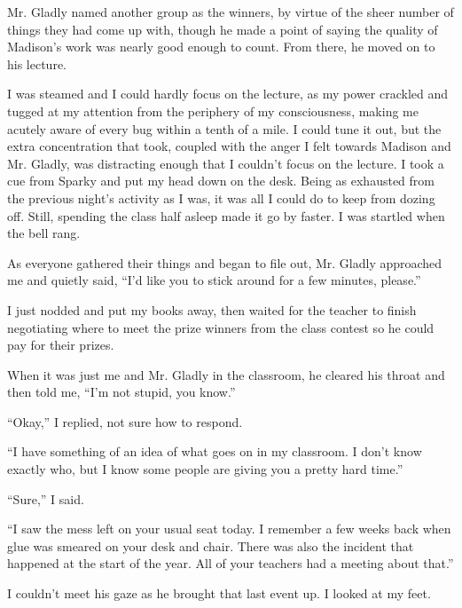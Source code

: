 Mr. Gladly named another group as the winners, by virtue of the sheer number of things they had come up with, though he made a point of saying the quality of Madison's work was nearly good enough to count.  From there, he moved on to his lecture.



I was steamed and I could hardly focus on the lecture, as my power crackled and tugged at my attention from the periphery of my consciousness, making me acutely aware of every bug within a tenth of a mile.  I could tune it out, but the extra concentration that took, coupled with the anger I felt towards Madison and Mr. Gladly, was distracting enough that I couldn't focus on the lecture.  I took a cue from Sparky and put my head down on the desk.  Being as exhausted from the previous night's activity as I was, it was all I could do to keep from dozing off.  Still, spending the class half asleep made it go by faster.  I was startled when the bell rang.



As everyone gathered their things and began to file out, Mr. Gladly approached me and quietly said, ``I'd like you to stick around for a few minutes, please.''



I just nodded and put my books away, then waited for the teacher to finish negotiating where to meet the prize winners from the class contest so he could pay for their prizes.



When it was just me and Mr. Gladly in the classroom, he cleared his throat and then told me, ``I'm not stupid, you know.''



``Okay,'' I replied, not sure how to respond.



``I have something of an idea of what goes on in my classroom.  I don't know exactly who, but I know some people are giving you a pretty hard time.''



``Sure,'' I said.



``I saw the mess left on your usual seat today.  I remember a few weeks back when glue was smeared on your desk and chair.  There was also the incident that happened at the start of the year.  All of your teachers had a meeting about that.''



I couldn't meet his gaze as he brought that last event up.  I looked at my feet.



